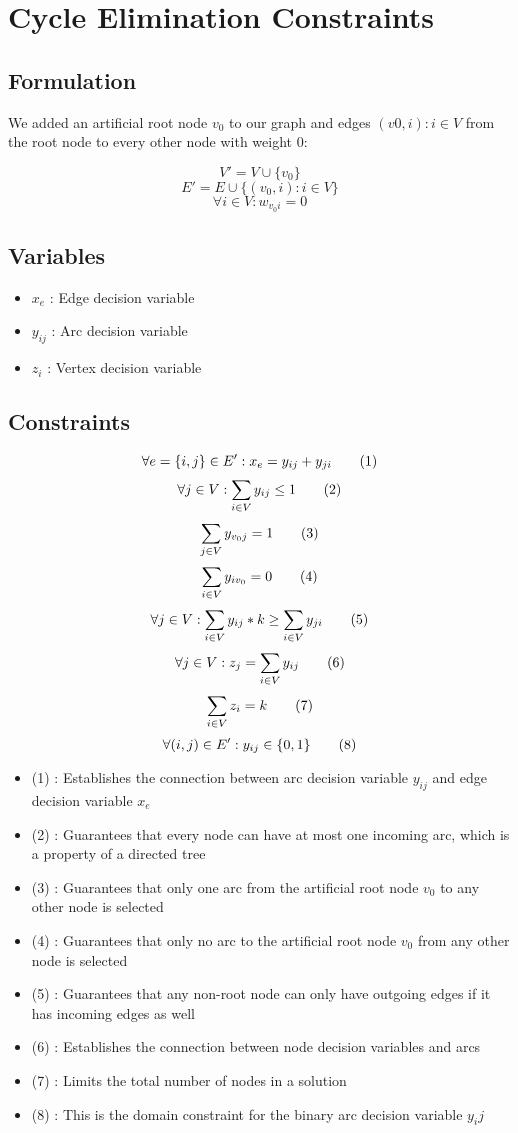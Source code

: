 \section{Cycle Elimination Constraints}

\subsection{Formulation}

We added an artificial root node $v_0$ to our graph and edges $(v0,i) : i \in V$  from the root node to every other node with weight $0$:

\[V' = V \cup \{v_0\}\]
\[E' = E \cup \{(v_0,i) : i \in V\}\]
\[\forall i \in V : w_{v_0i} = 0 \]

\subsection{Variables}

\begin{itemize}
	\item $x_{e}$ : Edge decision variable
	\item $y_{ij}$ : Arc decision variable
	\item $z_{i}$ : Vertex decision variable
\end{itemize}

\subsection{Constraints}
\[\forall e = \{i,j\} \in E' : x_e = y_{ij} + y_{ji} \addtag \]
\[\forall j \in V : \sum_{i \in V}y_{ij} \leq 1 \addtag \]
\[\sum_{j \in V}y_{v_0j} = 1 \addtag \]
\[\sum_{i \in V}y_{iv_0} = 0 \addtag \]
\[\forall j \in V : \sum_{i \in V}y_{ij} * k \geq \sum_{i \in V}y_{ji} \addtag \]
\[\forall j \in V : z_j = \sum_{i \in V}y_{ij} \addtag \]
\[\sum_{i \in V}z_i = k \addtag \]
\[\forall (i,j) \in E' : y_{ij} \in \{0,1\} \addtag \]

\begin{itemize}
	\item (1) : Establishes the connection between arc decision variable $y_{ij}$ and edge decision variable $x_e$
	\item (2) : Guarantees that every node can have at most one incoming arc, which is a property of a directed tree
	\item (3) : Guarantees that only one arc from the artificial root node $v_0$ to any other node is selected
   	\item (4) : Guarantees that only no arc to the artificial root node $v_0$ from any other node is selected
   	\item (5) : Guarantees that any non-root node can only have outgoing edges if it has incoming edges as well
   	\item (6) : Establishes the connection between node decision variables and arcs
   	\item (7) : Limits the total number of nodes in a solution
	\item (8) : This is the domain constraint for the binary arc decision variable $y_ij$
\end{itemize}

